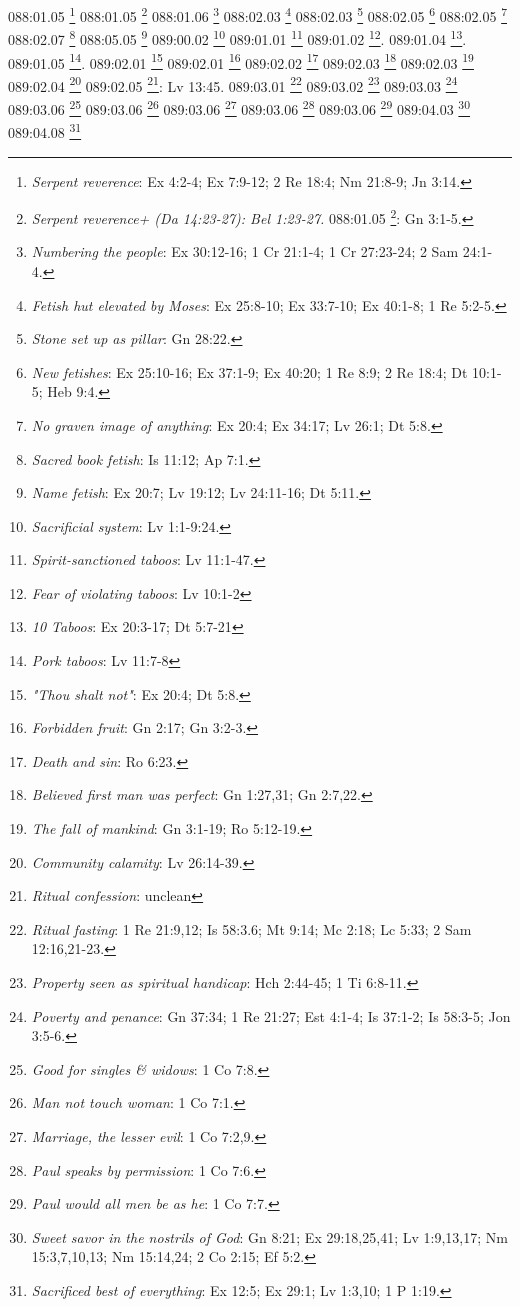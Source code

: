 {{{{{{{{{{{{{{{{{{{{088:01.05 \footnote{\textit{Serpent reverence}: Ex 4:2-4; Ex 7:9-12; 2 Re 18:4; Nm 21:8-9; Jn 3:14.}
088:01.05 \footnote{\textit{Serpent reverence+ (Da 14:23-27): Bel 1:23-27.}
088:01.05 \footnote{\textit{Snake}: voice of evil spirits}: Gn 3:1-5.}
088:01.06 \footnote{\textit{Numbering the people}: Ex 30:12-16; 1 Cr 21:1-4; 1 Cr 27:23-24; 2 Sam 24:1-4.}
088:02.03 \footnote{\textit{Fetish hut elevated by Moses}: Ex 25:8-10; Ex 33:7-10; Ex 40:1-8; 1 Re 5:2-5.}
088:02.03 \footnote{\textit{Stone set up as pillar}: Gn 28:22.}
088:02.05 \footnote{\textit{New fetishes}: Ex 25:10-16; Ex 37:1-9; Ex 40:20; 1 Re 8:9; 2 Re 18:4; Dt 10:1-5; Heb 9:4.}
088:02.05 \footnote{\textit{No graven image of anything}: Ex 20:4; Ex 34:17; Lv 26:1; Dt 5:8.}
088:02.07 \footnote{\textit{Sacred book fetish}: Is 11:12; Ap 7:1.}
088:05.05 \footnote{\textit{Name fetish}: Ex 20:7; Lv 19:12; Lv 24:11-16; Dt 5:11.}
089:00.02 \footnote{\textit{Sacrificial system}: Lv 1:1-9:24.}
089:01.01 \footnote{\textit{Spirit-sanctioned taboos}: Lv 11:1-47.}
089:01.02 \footnote{\textit{Fear of violating taboos}: Lv 10:1-2}.}
089:01.04 \footnote{\textit{10 Taboos}: Ex 20:3-17; Dt 5:7-21}.}
089:01.05 \footnote{\textit{Pork taboos}: Lv 11:7-8}.}
089:02.01 \footnote{\textit{"Thou shalt not"}: Ex 20:4; Dt 5:8.}
089:02.01 \footnote{\textit{Forbidden fruit}: Gn 2:17; Gn 3:2-3.}
089:02.02 \footnote{\textit{Death and sin}: Ro 6:23.}
089:02.03 \footnote{\textit{Believed first man was perfect}: Gn 1:27,31; Gn 2:7,22.}
089:02.03 \footnote{\textit{The fall of mankind}: Gn 3:1-19; Ro 5:12-19.}
089:02.04 \footnote{\textit{Community calamity}: Lv 26:14-39.}
089:02.05 \footnote{\textit{Ritual confession}: unclean}: Lv 13:45.}
089:03.01 \footnote{\textit{Ritual fasting}: 1 Re 21:9,12; Is 58:3.6; Mt 9:14; Mc 2:18; Lc 5:33; 2 Sam 12:16,21-23.}
089:03.02 \footnote{\textit{Property seen as spiritual handicap}: Hch 2:44-45; 1 Ti 6:8-11.}
089:03.03 \footnote{\textit{Poverty and penance}: Gn 37:34; 1 Re 21:27; Est 4:1-4; Is 37:1-2; Is 58:3-5; Jon 3:5-6.}
089:03.06 \footnote{\textit{Good for singles & widows}: 1 Co 7:8.}
089:03.06 \footnote{\textit{Man not touch woman}: 1 Co 7:1.}
089:03.06 \footnote{\textit{Marriage, the lesser evil}: 1 Co 7:2,9.}
089:03.06 \footnote{\textit{Paul speaks by permission}: 1 Co 7:6.}
089:03.06 \footnote{\textit{Paul would all men be as he}: 1 Co 7:7.}
089:04.03 \footnote{\textit{Sweet savor in the nostrils of God}: Gn 8:21; Ex 29:18,25,41; Lv 1:9,13,17; Nm 15:3,7,10,13; Nm 15:14,24; 2 Co 2:15; Ef 5:2.}
089:04.08 \footnote{\textit{Sacrificed best of everything}: Ex 12:5; Ex 29:1; Lv 1:3,10; 1 P 1:19.}
}}}}}}}}}}}}}}}}

